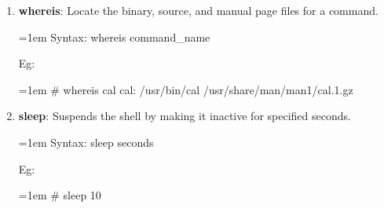 \begin{flushleft}
\begin{enumerate}
		
		\bigskip
		\bigskip
		
		\item \textbf{whereis}: Locate the binary, source, and manual page files for a command.
		\bigskip
		\begin{tcolorbox}[breakable,notitle,boxrule=1pt,colback=pink,colframe=pink]
			\color{black}
			\font=1em
			Syntax: whereis command\_name
			\font=4pt
		\end{tcolorbox}
		Eg:
		\bigskip
		\begin{tcolorbox}[breakable,notitle,boxrule=1pt,colback=black,colframe=black]
			\color{green}
			\font=1em
			\# whereis cal
			\newline
			\color{white}
			cal: /usr/bin/cal /usr/share/man/man1/cal.1.gz
			\font=4pt
		\end{tcolorbox}
		\bigskip
		\bigskip
		

		\item \textbf{sleep}: Suspends the shell by making it inactive for specified seconds.
		\begin{tcolorbox}[breakable,notitle,boxrule=1pt,colback=pink,colframe=pink]
			\color{black}
			\font=1em
			Syntax: sleep seconds
			\font=4pt
		\end{tcolorbox}
		Eg:
		\bigskip
		\begin{tcolorbox}[breakable,notitle,boxrule=1pt,colback=black,colframe=black]
			\color{green}
			\font=1em
			\# sleep 10
			\font=4pt
		\end{tcolorbox}
		\bigskip
		\bigskip	


\end{enumerate}
\end{flushleft}
